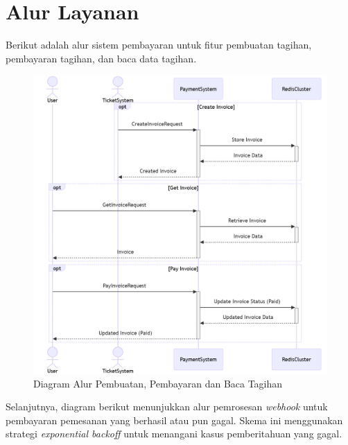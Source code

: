 \section{Alur Layanan}

Berikut adalah alur sistem pembayaran untuk fitur pembuatan tagihan, pembayaran tagihan, dan baca data tagihan.

\begin{figure}[htbp]
    \centering
    \includegraphics[width=1\textwidth]{resources/chapter-3/payment-flow1.png}
    \caption{Diagram Alur Pembuatan, Pembayaran dan Baca Tagihan}
    \label{fig:payment-flow1}
\end{figure}

\pagebreak

Selanjutnya, diagram berikut menunjukkan alur pemrosesan \textit{webhook} untuk pembayaran pemesanan yang berhasil atau pun gagal. Skema ini menggunakan strategi \textit{exponential backoff} untuk menangani kasus pemberitahuan yang gagal.

